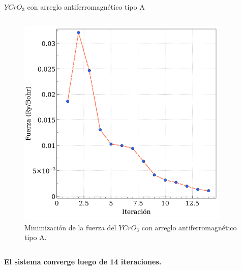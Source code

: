 \begin{frame}{$YCrO_{3}$ con arreglo antiferromagn\'etico tipo A}
\begin{columns}[t]
\begin{figure}[H]
            \includegraphics[width=0.9\textwidth]{contenido/resultados/img_resultados/fuerza_YCO_A.png}
            \caption{Minimizaci\'on de la fuerza del $YCrO_{3}$ con arreglo 
                antiferromagn\'etico tipo A.}
        \end{figure}
    \end{columns}
\centering
\textbf{El sistema converge luego de 14 iteraciones.}
\end{frame}


